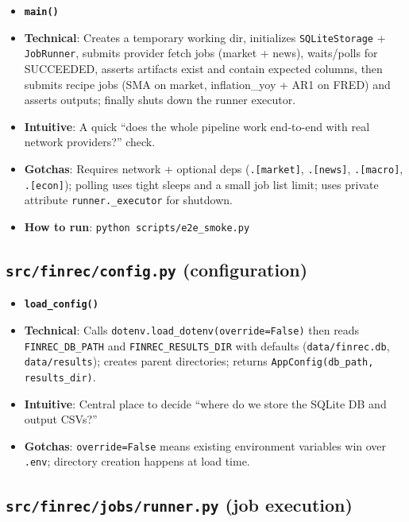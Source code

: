 \documentclass[11pt]{article}
\begin{document}
\begin{itemize}[leftmargin=*,nosep]
\item \textbf{\texttt{main()}}
\item \textbf{Technical}: Creates a temporary working dir, initializes \texttt{SQLiteStorage} + \texttt{JobRunner}, submits provider fetch jobs (market + news), waits/polls for SUCCEEDED, asserts artifacts exist and contain expected columns, then submits recipe jobs (SMA on market, inflation\_yoy + AR1 on FRED) and asserts outputs; finally shuts down the runner executor.
\item \textbf{Intuitive}: A quick “does the whole pipeline work end-to-end with real network providers?” check.
\item \textbf{Gotchas}: Requires network + optional deps (\texttt{.[market]}, \texttt{.[news]}, \texttt{.[macro]}, \texttt{.[econ]}); polling uses tight sleeps and a small job list limit; uses private attribute \texttt{runner.\_executor} for shutdown.
\item \textbf{How to run}: \texttt{python scripts/e2e\_smoke.py}
\end{itemize}


\subsection{\texttt{src/finrec/config.py} (configuration)}


\begin{itemize}[leftmargin=*,nosep]
\item \textbf{\texttt{load\_config()}}
\item \textbf{Technical}: Calls \texttt{dotenv.load\_dotenv(override=False)} then reads \texttt{FINREC\_DB\_PATH} and \texttt{FINREC\_RESULTS\_DIR} with defaults (\texttt{data/finrec.db}, \texttt{data/results}); creates parent directories; returns \texttt{AppConfig(db\_path, results\_dir)}.
\item \textbf{Intuitive}: Central place to decide “where do we store the SQLite DB and output CSVs?”
\item \textbf{Gotchas}: \texttt{override=False} means existing environment variables win over \texttt{.env}; directory creation happens at load time.
\end{itemize}


\subsection{\texttt{src/finrec/jobs/runner.py} (job execution)}
\end{document}
